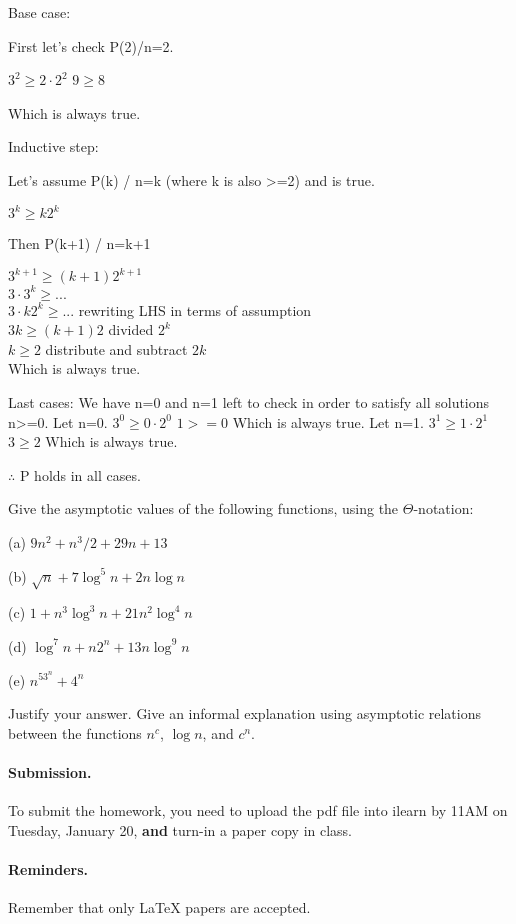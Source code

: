\documentclass{article}
\begin{document}
\begin{flushleft}
Base case:

First let's check P(2)/n=2.

$3^2 \ge 2\cdot2^2$
$9 \ge 8$

Which is always true.

\vskip 0.1in
Inductive step:

Let's assume P(k) / n=k (where k is also >=2) and is true.

$3^k \ge k2^k$

Then P(k+1) / n=k+1

$3^{k+1} \ge (k+1)2^{k+1}$ \\
$3\cdot3^k \ge ...$  \\
$3\cdot k 2^k \ge ...$ rewriting LHS in terms of assumption \\
$3k \ge (k+1)2$ divided $2^k$ \\
$k \ge 2$ distribute and subtract $2k$ \\
Which is always true.

\vskip 0.1in
Last cases:
We have n=0 and n=1 left to check in order to satisfy all solutions n>=0.
Let n=0.
$3^0 \ge 0\cdot2^0$
$1 >= 0$
Which is always true.
Let n=1.
$3^1 \ge 1\cdot2^1$
$3 \ge 2$
Which is always true.

\vskip 0.1in
$\therefore$ P holds in all cases.

\end{flushleft}




\begin{problem}
Give the asymptotic values of the
following functions, using the $\Theta$-notation:
%
\begin{description}
%
\item{(a)} $9n^2 + n^3/2 + 29n + 13$
\item{(b)} $\sqrt{n}+ 7\log^5 n + 2n\log n$
\item{(c)} $1+ n^3\log^3n + 21 n^2\log^4n$
\item{(d)} $\log^7n + n 2^n + 13n\log^9n$
\item{(e)} $n^53^n+4^n$
%
\end{description}
%
Justify your answer.
Give an informal explanation using asymptotic
relations between the functions $n^c$, $\log n$, and $c^n$.
\end{problem}


\vskip 0.1in
\paragraph{Submission.}
To submit the homework, you need to upload the pdf file into ilearn by 11AM on Tuesday, January 20,
\textbf{and} turn-in a paper copy in class.

\paragraph{Reminders.}
Remember that only {\LaTeX} papers are accepted. 
\end{document}
